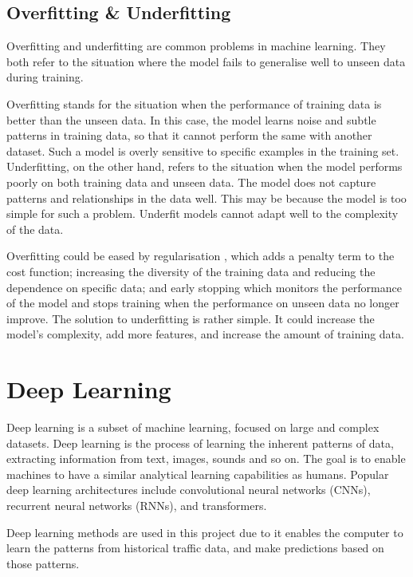 \subsection{Overfitting \& Underfitting}

Overfitting and underfitting are common problems in machine learning. They both refer to the situation where the model fails to generalise well to unseen data during training. 

Overfitting stands for the situation when the performance of training data is better than the unseen data. In this case, the model learns noise and subtle patterns in training data, so that it cannot perform the same with another dataset. 
Such a model is overly sensitive to specific examples in the training set. Underfitting, on the other hand, refers to the situation when the model performs poorly on both training data and unseen data. 
The model does not capture patterns and relationships in the data well. This may be because the model is too simple for such a problem. 
Underfit models cannot adapt well to the complexity of the data. 

Overfitting could be eased by regularisation \cite{Santos_2022}, which adds a penalty term to the cost function; increasing the diversity of the training data and reducing the dependence on specific data; and early stopping which monitors the performance of the model and stops training when the performance on unseen data no longer improve. 
The solution to underfitting is rather simple. It could increase the model's complexity, add more features, and increase the amount of training data.

\section{Deep Learning}

Deep learning is a subset of machine learning, focused on large and complex datasets. 
Deep learning is the process of learning the inherent patterns of data, extracting information from text, images, sounds and so on. 
The goal is to enable machines to have a similar analytical learning capabilities as humans. 
Popular deep learning architectures include convolutional neural networks (CNNs), recurrent neural networks (RNNs), and transformers.

Deep learning methods are used in this project due to it enables the computer to learn the patterns from historical traffic data, and make predictions based on those patterns.

